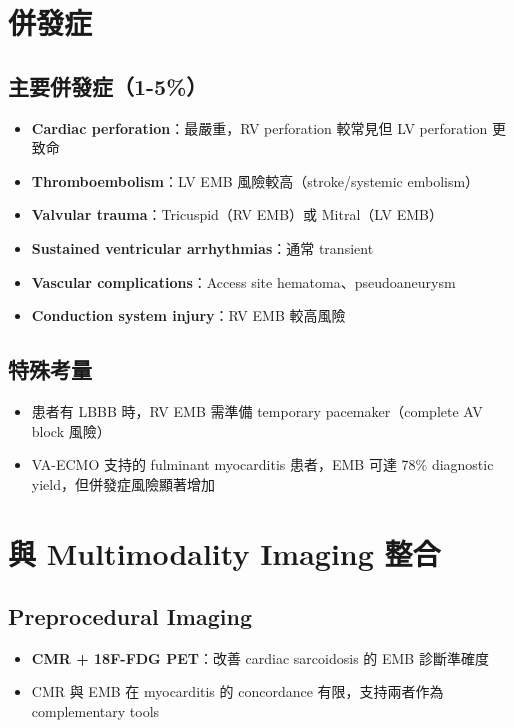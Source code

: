 \documentclass[12pt,a4paper]{article}
\begin{document}
\section{併發症}

\subsection{主要併發症（1-5\%）}

\begin{itemize}
    \item \textbf{Cardiac perforation}：最嚴重，RV perforation 較常見但 LV perforation 更致命
    \item \textbf{Thromboembolism}：LV EMB 風險較高（stroke/systemic embolism）
    \item \textbf{Valvular trauma}：Tricuspid（RV EMB）或 Mitral（LV EMB）
    \item \textbf{Sustained ventricular arrhythmias}：通常 transient
    \item \textbf{Vascular complications}：Access site hematoma、pseudoaneurysm
    \item \textbf{Conduction system injury}：RV EMB 較高風險
\end{itemize}

\subsection{特殊考量}

\begin{itemize}
    \item 患者有 LBBB 時，RV EMB 需準備 temporary pacemaker（complete AV block 風險）
    \item VA-ECMO 支持的 fulminant myocarditis 患者，EMB 可達 78\% diagnostic yield，但併發症風險顯著增加
\end{itemize}

\section{與 Multimodality Imaging 整合}

\subsection{Preprocedural Imaging}

\begin{itemize}
    \item \textbf{CMR + 18F-FDG PET}：改善 cardiac sarcoidosis 的 EMB 診斷準確度
    \item CMR 與 EMB 在 myocarditis 的 concordance 有限，支持兩者作為 complementary tools
\end{itemize}
\end{document}
